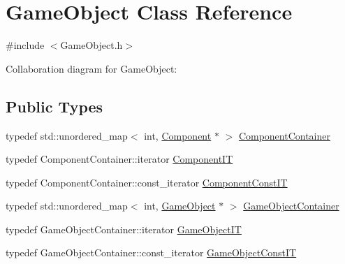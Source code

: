 \hypertarget{classGameObject}{}\section{Game\+Object Class Reference}
\label{classGameObject}


{\ttfamily \#include $<$Game\+Object.\+h$>$}



Collaboration diagram for Game\+Object\+:
\subsection*{Public Types}
\begin{DoxyCompactItemize}
\item 
typedef std\+::unordered\+\_\+map$<$ int, \hyperlink{classComponent}{Component} $\ast$ $>$ \hyperlink{classGameObject_a1b427560e7cbc5b2849ceec5f0780231}{Component\+Container}
\item 
typedef Component\+Container\+::iterator \hyperlink{classGameObject_ab17e7f4a9628567d8c1bbdb2c2cf42ae}{Component\+IT}
\item 
typedef Component\+Container\+::const\+\_\+iterator \hyperlink{classGameObject_a2eb725c491bcd045fc1b533f36addddf}{Component\+Const\+IT}
\item 
typedef std\+::unordered\+\_\+map$<$ int, \hyperlink{classGameObject}{Game\+Object} $\ast$ $>$ \hyperlink{classGameObject_aeef18cd85b020970fc7e33bb1d0f834e}{Game\+Object\+Container}
\item 
typedef Game\+Object\+Container\+::iterator \hyperlink{classGameObject_afd3721c500c5f9e2f502e017df75f348}{Game\+Object\+IT}
\item 
typedef Game\+Object\+Container\+::const\+\_\+iterator \hyperlink{classGameObject_ac7d3edce4c190f8e784d7824dbf81713}{Game\+Object\+Const\+IT}
\end{DoxyCompactItemize}
